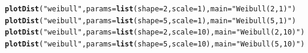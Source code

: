 \documentclass[twoside]{book}\usepackage[]{graphicx}\usepackage[]{xcolor}
\makeatletter
\newcommand{\hlnum}[1]{\textcolor[rgb]{0.686,0.059,0.569}{#1}}%
\newcommand{\hlstr}[1]{\textcolor[rgb]{0.192,0.494,0.8}{#1}}%
\newcommand{\hlstd}[1]{\textcolor[rgb]{0.345,0.345,0.345}{#1}}%
\newcommand{\hlkwc}[1]{\textcolor[rgb]{0.333,0.667,0.333}{#1}}%
\newcommand{\hlkwd}[1]{\textcolor[rgb]{0.737,0.353,0.396}{\textbf{#1}}}%
\newenvironment{kframe}{%
 \def\at@end@of@kframe{}%
 \ifinner\ifhmode%
  \def\at@end@of@kframe{\end{minipage}}%
  \begin{minipage}{\columnwidth}%
 \fi\fi%
 \def\FrameCommand##1{\hskip\@totalleftmargin \hskip-\fboxsep
 \colorbox{shadecolor}{##1}\hskip-\fboxsep
     \hskip-\linewidth \hskip-\@totalleftmargin \hskip\columnwidth}%
 \MakeFramed {\advance\hsize-\width
   \@totalleftmargin\z@ \linewidth\hsize
   \@setminipage}}%
 {\par\unskip\endMakeFramed%
 \at@end@of@kframe}
\newenvironment{knitrout}{}{} %
\makeatother
\begin{document}
\begin{knitrout}
{}



\end{knitrout}

\begin{knitrout}
\color{fgcolor}\begin{kframe}
\begin{alltt}
\hlkwd{plotDist}\hlstd{(}\hlstr{"weibull"}\hlstd{,} \hlkwc{params} \hlstd{=} \hlkwd{list}\hlstd{(}\hlkwc{shape} \hlstd{=} \hlnum{2}\hlstd{,} \hlkwc{scale} \hlstd{=} \hlnum{1}\hlstd{),} \hlkwc{main} \hlstd{=} \hlstr{"Weibull(2,1)"}\hlstd{)}
\hlkwd{plotDist}\hlstd{(}\hlstr{"weibull"}\hlstd{,} \hlkwc{params} \hlstd{=} \hlkwd{list}\hlstd{(}\hlkwc{shape} \hlstd{=} \hlnum{5}\hlstd{,} \hlkwc{scale} \hlstd{=} \hlnum{1}\hlstd{),} \hlkwc{main} \hlstd{=} \hlstr{"Weibull(5,1)"}\hlstd{)}
\hlkwd{plotDist}\hlstd{(}\hlstr{"weibull"}\hlstd{,} \hlkwc{params} \hlstd{=} \hlkwd{list}\hlstd{(}\hlkwc{shape} \hlstd{=} \hlnum{2}\hlstd{,} \hlkwc{scale} \hlstd{=} \hlnum{10}\hlstd{),} \hlkwc{main} \hlstd{=} \hlstr{"Weibull(2,10)"}\hlstd{)}
\hlkwd{plotDist}\hlstd{(}\hlstr{"weibull"}\hlstd{,} \hlkwc{params} \hlstd{=} \hlkwd{list}\hlstd{(}\hlkwc{shape} \hlstd{=} \hlnum{5}\hlstd{,} \hlkwc{scale} \hlstd{=} \hlnum{10}\hlstd{),} \hlkwc{main} \hlstd{=} \hlstr{"Weibull(5,10)"}\hlstd{)}
\end{alltt}
\end{kframe}


\end{knitrout}
\end{document}

